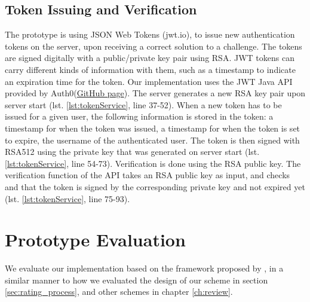 \subsection{Token Issuing and Verification} \label{sec:tokens}
The prototype is using JSON Web Tokens (jwt.io), to issue new authentication tokens on the server, upon receiving a correct solution to a challenge. The tokens are signed digitally with a public/private key pair using RSA. JWT tokens can carry different kinds of information with them, such as a timestamp to indicate an expiration time for the token. 
Our implementation uses the JWT Java API provided by Auth$0$(\href{https://github.com/auth0/java-jwt}{GitHub page}). The server generates a new RSA key pair upon server start (lst. \ref{lst:tokenService}, line 37-52). When a new token has to be issued for a given user, the following information is stored in the token: a timestamp for when the token was issued, a timestamp for when the token is set to expire, the username of the authenticated user. The token is then signed with RSA512 using the private key that was generated on server start (lst. \ref{lst:tokenService}, line 54-73). Verification is done using the RSA public key. The verification function of the API takes an RSA public key as input, and checks and that the token is signed by the corresponding private key and not expired yet (lst. \ref{lst:tokenService}, line 75-93). 


\section{Prototype Evaluation}\label{sec:prot_eval}
We evaluate our implementation based on the framework proposed by \citet{bonneau2012quest}, in a similar manner to how we evaluated the design of our scheme in section \ref{sec:rating_process}, and other schemes in chapter \ref{ch:review}. 

